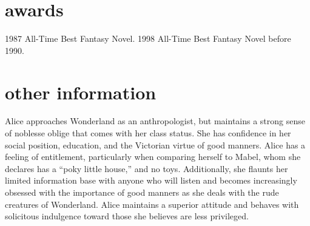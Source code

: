 \documentclass[]{mchcv}
\begin{document}
%

\section{awards}

\begin{twentyshort}
  \twentyitemshort
    {1987}
    {All-Time Best Fantasy Novel.}
  \twentyitemshort
    {1998}
    {All-Time Best Fantasy Novel before 1990.}
\end{twentyshort}


\section{other information}
Alice approaches Wonderland as an anthropologist, but maintains a strong sense of noblesse oblige that comes with her class status. She has confidence in her social position, education, and the Victorian virtue of good manners. Alice has a feeling of entitlement, particularly when comparing herself to Mabel, whom she declares has a “poky little house,” and no toys. Additionally, she flaunts her limited information base with anyone who will listen and becomes increasingly obsessed with the importance of good manners as she deals with the rude creatures of Wonderland. Alice maintains a superior attitude and behaves with solicitous indulgence toward those she believes are less privileged.

\end{document}
